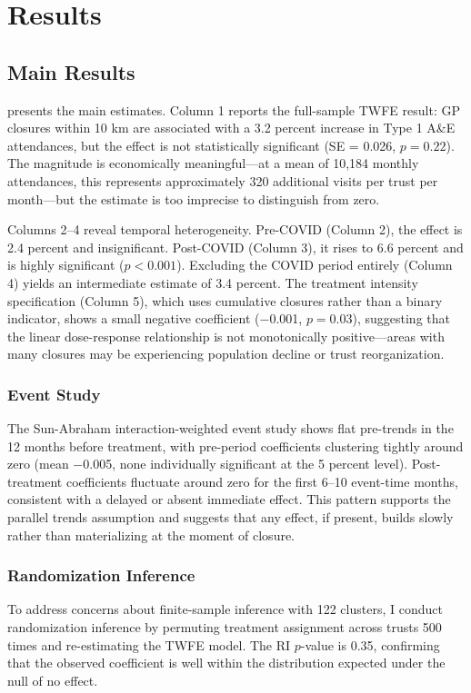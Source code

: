 \documentclass[12pt]{article}
\begin{document}
\section{Results}

\subsection{Main Results}

 presents the main estimates. Column 1 reports the full-sample TWFE result: GP closures within 10 km are associated with a 3.2 percent increase in Type 1 A\&E attendances, but the effect is not statistically significant (SE = 0.026, $p = 0.22$). The magnitude is economically meaningful---at a mean of 10,184 monthly attendances, this represents approximately 320 additional visits per trust per month---but the estimate is too imprecise to distinguish from zero.

Columns 2--4 reveal temporal heterogeneity. Pre-COVID (Column 2), the effect is 2.4 percent and insignificant. Post-COVID (Column 3), it rises to 6.6 percent and is highly significant ($p < 0.001$). Excluding the COVID period entirely (Column 4) yields an intermediate estimate of 3.4 percent. The treatment intensity specification (Column 5), which uses cumulative closures rather than a binary indicator, shows a small negative coefficient ($-$0.001, $p = 0.03$), suggesting that the linear dose-response relationship is not monotonically positive---areas with many closures may be experiencing population decline or trust reorganization.



\subsubsection*{Event Study}
The Sun-Abraham interaction-weighted event study shows flat pre-trends in the 12 months before treatment, with pre-period coefficients clustering tightly around zero (mean $-$0.005, none individually significant at the 5 percent level). Post-treatment coefficients fluctuate around zero for the first 6--10 event-time months, consistent with a delayed or absent immediate effect. This pattern supports the parallel trends assumption and suggests that any effect, if present, builds slowly rather than materializing at the moment of closure.

\subsubsection*{Randomization Inference}
To address concerns about finite-sample inference with 122 clusters, I conduct randomization inference by permuting treatment assignment across trusts 500 times and re-estimating the TWFE model. The RI $p$-value is 0.35, confirming that the observed coefficient is well within the distribution expected under the null of no effect.
\end{document}
